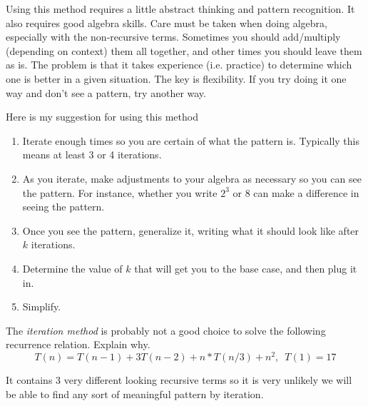 Using this method requires a little abstract thinking and pattern recognition.
It also requires good algebra skills.  
Care must be taken when doing algebra, especially with the non-recursive terms. 
Sometimes you should add/multiply  (depending on context) them all together,
and other times you should leave them as is.  The problem is that it takes
experience (i.e. practice) to determine which one is better in a given situation.
The key is flexibility.  If you try doing it one way and don't see a pattern, 
try another way.

Here is my suggestion for using this method
\begin{enumerate}
\item
Iterate enough times so you are certain of what the pattern is.  Typically this means
at least 3 or 4 iterations.
\item
As you iterate, make adjustments to your algebra as necessary so you can see the pattern.
For instance, whether you write $2^3$ or $8$ can make a difference in seeing the pattern.
\item
Once you see the pattern, generalize it, writing what it should look like after $k$ iterations.
\item
Determine the value of $k$ that will get you to the base case, and then plug it in.
\item
Simplify.
\end{enumerate}

\begin{ques}
The {\em iteration method} is probably not a good choice to solve the following recurrence relation.
Explain why. 
$$T(n)=T(n-1)+3T(n-2)+n*T(n/3)+n^2,\, \, \,  T(1)=17$$
\answerlinethree
\begin{answer}
It contains 3 very different looking recursive terms so it is very unlikely we will
be able to find any sort of meaningful pattern by iteration.
\end{answer}
\end{ques}


